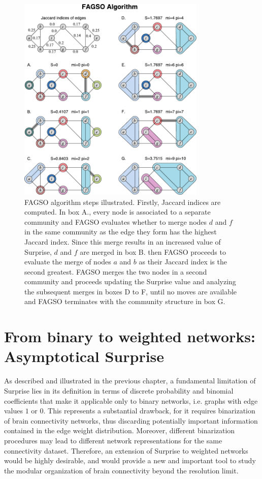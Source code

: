 \begin{figure}[htb!]
\centering
\includegraphics[width=0.8\textwidth]{images/fagso.pdf}
\caption{FAGSO algorithm steps illustrated. Firstly, Jaccard indices are computed. In box A., every node is associated to a separate community and FAGSO evaluates whether to merge nodes $d$ and $f$ in the same community as the edge they form has the highest Jaccard index. Since this merge results in an increased value of Surprise, $d$ and $f$ are merged in box B. then FAGSO proceeds to evaluate the merge of nodes $a$ and $b$ as their Jaccard index is the second greatest. FAGSO merges the two nodes in a second community and proceeds updating the Surprise value and analyzing the subsequent merges in boxes D to F, until no moves are available and FAGSO terminates with the community structure in box G.}
\label{fig:fagso_working}
\end{figure}

\section{From binary to weighted networks: Asymptotical Surprise}
As described and illustrated in the previous chapter, a fundamental limitation of Surprise lies in its definition in terms of discrete probability and binomial coefficients that make it applicable only to binary networks, i.e. graphs with edge values $1$ or $0$.
This represents a substantial drawback, for it requires binarization of brain connectivity networks, thus discarding potentially important information contained in the edge weight distribution.
Moreover, different binarization procedures may lead to different network representations for the same connectivity dataset.
Therefore, an extension of Surprise to weighted networks would be highly desirable, and would provide a new and important tool to study the modular organization of brain connectivity beyond the resolution limit.

